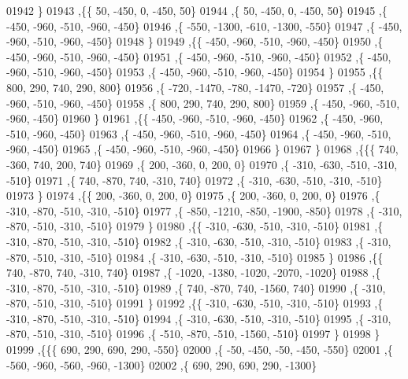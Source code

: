 \begin{DoxyCode}
01942     \}
01943    ,\{\{    50,  -450,     0,  -450,    50\}
01944     ,\{    50,  -450,     0,  -450,    50\}
01945     ,\{  -450,  -960,  -510,  -960,  -450\}
01946     ,\{  -550, -1300,  -610, -1300,  -550\}
01947     ,\{  -450,  -960,  -510,  -960,  -450\}
01948     \}
01949    ,\{\{  -450,  -960,  -510,  -960,  -450\}
01950     ,\{  -450,  -960,  -510,  -960,  -450\}
01951     ,\{  -450,  -960,  -510,  -960,  -450\}
01952     ,\{  -450,  -960,  -510,  -960,  -450\}
01953     ,\{  -450,  -960,  -510,  -960,  -450\}
01954     \}
01955    ,\{\{   800,   290,   740,   290,   800\}
01956     ,\{  -720, -1470,  -780, -1470,  -720\}
01957     ,\{  -450,  -960,  -510,  -960,  -450\}
01958     ,\{   800,   290,   740,   290,   800\}
01959     ,\{  -450,  -960,  -510,  -960,  -450\}
01960     \}
01961    ,\{\{  -450,  -960,  -510,  -960,  -450\}
01962     ,\{  -450,  -960,  -510,  -960,  -450\}
01963     ,\{  -450,  -960,  -510,  -960,  -450\}
01964     ,\{  -450,  -960,  -510,  -960,  -450\}
01965     ,\{  -450,  -960,  -510,  -960,  -450\}
01966     \}
01967    \}
01968   ,\{\{\{   740,  -360,   740,   200,   740\}
01969     ,\{   200,  -360,     0,   200,     0\}
01970     ,\{  -310,  -630,  -510,  -310,  -510\}
01971     ,\{   740,  -870,   740,  -310,   740\}
01972     ,\{  -310,  -630,  -510,  -310,  -510\}
01973     \}
01974    ,\{\{   200,  -360,     0,   200,     0\}
01975     ,\{   200,  -360,     0,   200,     0\}
01976     ,\{  -310,  -870,  -510,  -310,  -510\}
01977     ,\{  -850, -1210,  -850, -1900,  -850\}
01978     ,\{  -310,  -870,  -510,  -310,  -510\}
01979     \}
01980    ,\{\{  -310,  -630,  -510,  -310,  -510\}
01981     ,\{  -310,  -870,  -510,  -310,  -510\}
01982     ,\{  -310,  -630,  -510,  -310,  -510\}
01983     ,\{  -310,  -870,  -510,  -310,  -510\}
01984     ,\{  -310,  -630,  -510,  -310,  -510\}
01985     \}
01986    ,\{\{   740,  -870,   740,  -310,   740\}
01987     ,\{ -1020, -1380, -1020, -2070, -1020\}
01988     ,\{  -310,  -870,  -510,  -310,  -510\}
01989     ,\{   740,  -870,   740, -1560,   740\}
01990     ,\{  -310,  -870,  -510,  -310,  -510\}
01991     \}
01992    ,\{\{  -310,  -630,  -510,  -310,  -510\}
01993     ,\{  -310,  -870,  -510,  -310,  -510\}
01994     ,\{  -310,  -630,  -510,  -310,  -510\}
01995     ,\{  -310,  -870,  -510,  -310,  -510\}
01996     ,\{  -510,  -870,  -510, -1560,  -510\}
01997     \}
01998    \}
01999   ,\{\{\{   690,   290,   690,   290,  -550\}
02000     ,\{   -50,  -450,   -50,  -450,  -550\}
02001     ,\{  -560,  -960,  -560,  -960, -1300\}
02002     ,\{   690,   290,   690,   290, -1300\}

\end{DoxyCode}
